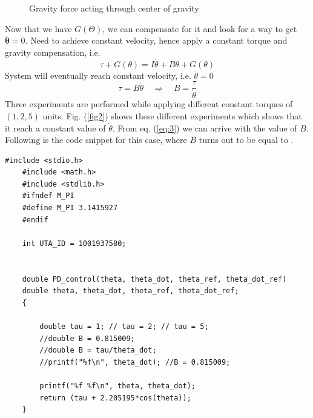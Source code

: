 \documentclass[12pt]{article}
\begin{document}
\begin{figure}[h]
	\vspace{-1mm}
	\caption{Gravity force acting through center of gravity}
	\label{fig1}
\end{figure}

Now that we have $G(\Theta)$, we can compensate for it and look for a way to get $\ddot{\mathbf{\theta}} = 0$. Need to achieve constant velocity, hence apply a constant torque and gravity compensation, i.e. 
\begin{equation}
	\tau +G(\theta)=I \ddot{\theta}+B \dot{\theta}+G(\theta)
\end{equation}
System will eventually reach constant velocity, i.e. $\ddot{\theta}=0$ 
\begin{equation}\label{eq:3}
	\tau=B \dot{\theta} \quad \Rightarrow \quad B=\frac{\tau}{\dot{\theta}}
\end{equation}
Three experiments are performed while applying different constant torques of $(1, 2, 5)$ units. Fig. (\ref{fig2}) shows these different experiments which shows that it reach a constant value of $\dot{\theta}$. From eq. (\ref{eq:3}) we can arrive with the value of $B$. Following is the code snippet for this case, where $B$ turns out to be equal to .
\begin{lstlisting}[style=CStyle]
	#include <stdio.h>
	#include <math.h>
	#include <stdlib.h>
	#ifndef M_PI
	#define M_PI 3.1415927
	#endif
	
	int UTA_ID = 1001937580;
	
	
	double PD_control(theta, theta_dot, theta_ref, theta_dot_ref)
	double theta, theta_dot, theta_ref, theta_dot_ref;
	{
		
		double tau = 1; // tau = 2; // tau = 5;
		//double B = 0.815009;
		//double B = tau/theta_dot;
		//printf("%f\n", theta_dot); //B = 0.815009;
		
		printf("%f %f\n", theta, theta_dot);
		return (tau + 2.205195*cos(theta));
	}
\end{lstlisting}	
\end{document}
